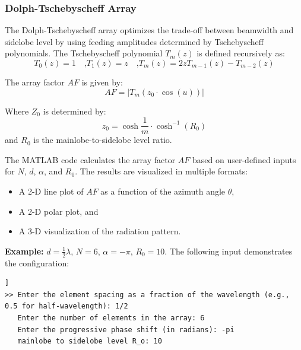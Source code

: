\documentclass[a4paper, 12pt, english]{article}
\begin{document}
\subsubsection{Dolph-Tschebyscheff Array} \label{sec:dolph-tscheyscheff array}



The Dolph-Tschebyscheff array optimizes the trade-off between beamwidth and sidelobe level by using feeding amplitudes determined by Tschebyscheff polynomials. The Tschebyscheff polynomial $ {{T}_{m}}{\left({z}\right)} $ is defined recursively as:
\[ {{{{T}_{0}}{\left({z}\right)}} = {1}} \quad\mbox{,} {{{{T}_{1}}{\left({z}\right)}} = {z}} \quad\mbox{,} {{{{T}_{m}}{\left({z}\right)}} = {{2}{z}{{T}_{{m}-{1}}}{\left({z}\right)}} - {{T}_{{m}-{2}}}{\left({z}\right)}} \]

\noindent
The array factor $ {AF} $ is given by:
\[ {AF} = \left| {{T}_{m}}{\left({{z}_{0} \cdot {\cos{\left({u}\right)}}}\right)} \right| \]

\noindent
Where $ {{Z}_{0}} $ is determined by:
\[ {{z}_{0}} = \cosh{{\frac{1}{m}} \cdot \cosh^{-1}{\left({R}_{0}\right)}} \]
and $ {{R}_{0}} $ is the mainlobe-to-sidelobe level ratio.

\noindent
The MATLAB code calculates the array factor $ {AF} $ based on user-defined inputs for $ {N} $, $ {d} $, $ {\alpha} $, and $ {{R}_{0}} $. The results are visualized in multiple formats:
\begin{itemize}
    \item A 2-D line plot of $ {AF} $ as a function of the azimuth angle $ {\theta} $,
    \item A 2-D polar plot, and
    \item A 3-D visualization of the radiation pattern.
\end{itemize}

\noindent
\textbf{Example:} $ {d} = {\frac{1}{2}}{\lambda} $, $ {N} = {6} $, $ {\alpha} = -{\pi} $, $ {{R}_{0}} = {10} $.
\newline
The following input demonstrates the configuration:
\begin{lstlisting}[style=commandstyle,caption=Command line output]]
>> Enter the element spacing as a fraction of the wavelength (e.g., 0.5 for half-wavelength): 1/2
   Enter the number of elements in the array: 6
   Enter the progressive phase shift (in radians): -pi
   mainlobe to sidelobe level R_o: 10
\end{lstlisting}
\end{document}

